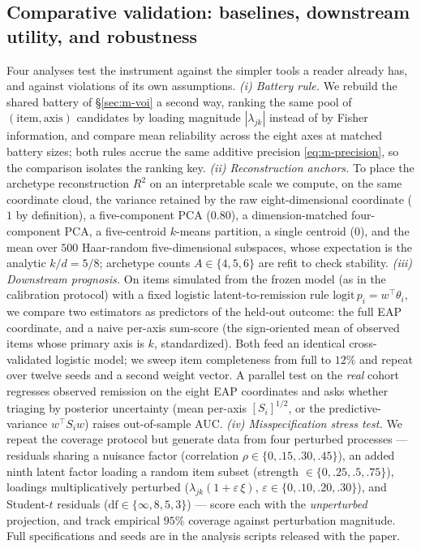 \subsection{Comparative validation: baselines, downstream utility, and robustness}
\label{sec:m-validate}

Four analyses test the instrument against the simpler tools a reader already has, and
against violations of its own assumptions. \emph{(i) Battery rule.} We rebuild the
shared battery of \S\ref{sec:m-voi} a second way, ranking the same pool of
$(\text{item},\text{axis})$ candidates by loading magnitude $|\lambda_{jk}|$ instead
of by Fisher information, and compare mean reliability across the eight axes at
matched battery sizes; both rules accrue the same additive precision
\eqref{eq:m-precision}, so the comparison isolates the ranking key. \emph{(ii)
Reconstruction anchors.} To place the archetype reconstruction $R^2$ on an
interpretable scale we compute, on the same coordinate cloud, the variance retained
by the raw eight-dimensional coordinate ($1$ by definition), a five-component PCA
($0.80$), a dimension-matched four-component PCA, a five-centroid $k$-means
partition, a single centroid ($0$), and the mean over $500$ Haar-random
five-dimensional subspaces, whose expectation is the analytic $k/d=5/8$; archetype
counts $A\in\{4,5,6\}$ are refit to check stability. \emph{(iii) Downstream
prognosis.} On items simulated from the frozen model (as in the calibration
protocol) with a fixed logistic latent-to-remission rule
$\mathrm{logit}\,p_i=w^{\top}\theta_i$, we compare two estimators as predictors of
the held-out outcome: the full EAP coordinate, and a naive per-axis sum-score (the
sign-oriented mean of observed items whose primary axis is $k$, standardized). Both
feed an identical cross-validated logistic model; we sweep item completeness from
full to $12\%$ and repeat over twelve seeds and a second weight vector. A parallel
test on the \emph{real} cohort regresses observed remission on the eight EAP
coordinates and asks whether triaging by posterior uncertainty (mean per-axis
$[S_i]^{1/2}$, or the predictive-variance $w^{\top}S_i w$) raises out-of-sample AUC.
\emph{(iv) Misspecification stress test.} We repeat the coverage protocol but
generate data from four perturbed processes --- residuals sharing a nuisance factor
(correlation $\rho\in\{0,.15,.30,.45\}$), an added ninth latent factor loading a
random item subset (strength $\in\{0,.25,.5,.75\}$), loadings multiplicatively
perturbed ($\lambda_{jk}(1+\varepsilon\,\xi)$, $\varepsilon\in\{0,.10,.20,.30\}$),
and Student-$t$ residuals ($\mathrm{df}\in\{\infty,8,5,3\}$) --- score each with the
\emph{unperturbed} projection, and track empirical $95\%$ coverage against
perturbation magnitude. Full specifications and seeds are in the analysis scripts
released with the paper.

